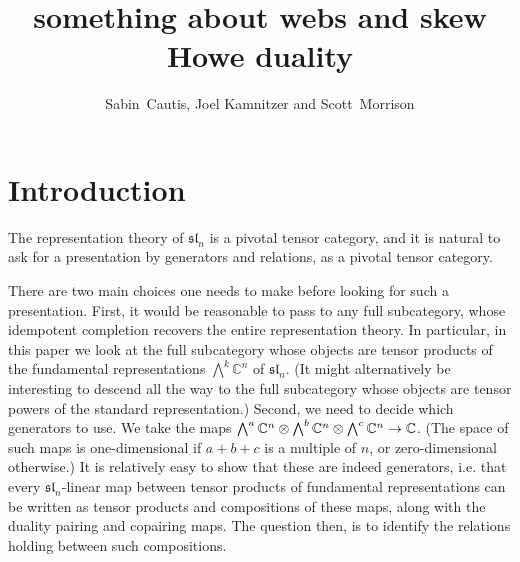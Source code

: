 \documentclass[11pt,leqno]{article}
\title{something about webs and skew Howe duality}
\author{Sabin~Cautis, Joel Kamnitzer and Scott~Morrison}
\begin{document}
\makeatletter
{}
\gdef\theequation{\thesection.\arabic{equation}}
\makeatother

\maketitle

\begin{abstract}
\end{abstract}


\tableofcontents


\newcommand{\alt}{\wedge}
\newcommand{\Alt}{\bigwedge}

\renewcommand{\sl}[1]{\mathfrak{sl}_{#1}}
\newcommand{\Usl}[1]{U\sl{#1}}

\section{Introduction}
The representation theory of $\sl{n}$ is a pivotal tensor category, and it is natural to ask for a presentation by generators and relations, as a pivotal tensor category.

There are two main choices one needs to make before looking for such a presentation. First, it would be reasonable to pass to any full subcategory, whose idempotent completion recovers the entire representation theory. In particular, in this paper we look at the full subcategory whose objects are tensor products of the fundamental representations $\Alt^k \mathbb C^n$ of $\sl{n}$. (It might alternatively be interesting to descend all the way to the full subcategory whose objects are tensor powers of the standard representation.) Second, we need to decide which generators to use. We take the maps $\Alt^a \mathbb{C}^n \tensor \Alt^b \mathbb{C}^n \tensor \Alt^c \mathbb{C}^n \to \mathbb{C}$. (The space of such maps is one-dimensional if $a+b+c$ is a multiple of $n$, or zero-dimensional otherwise.) It is relatively easy to show that these are indeed generators, i.e. that every $\sl{n}$-linear map between tensor products of fundamental representations can be written as tensor products and compositions of these maps, along with the duality pairing and copairing maps. The question then, is to identify the relations holding between such compositions.
\end{document}
